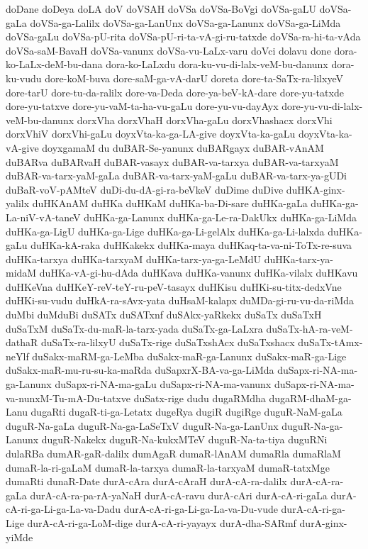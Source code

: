 {doDane
doDeya
doLA
doV
doVSAH
doVSa
doVSa-BoVgi
doVSa-gaLU
doVSa-gaLa
doVSa-ga-Lalilx
doVSa-ga-LanUnx
doVSa-ga-Lanunx
doVSa-ga-LiMda
doVSa-gaLu
doVSa-pU-rita
doVSa-pU-ri-ta-vA-gi-ru-tatxde
doVSa-ra-hi-ta-vAda
doVSa-saM-BavaH
doVSa-vanunx
doVSa-vu-LaLx-varu
doVci
dolavu
done
dora-ko-LaLx-deM-bu-dana
dora-ko-LaLxdu
dora-ku-vu-di-lalx-veM-bu-danunx
dora-ku-vudu
dore-koM-buva
dore-saM-ga-vA-darU
doreta
dore-ta-SaTx-ra-lilxyeV
dore-tarU
dore-tu-da-ralilx
dore-va-Deda
dore-ya-beV-kA-dare
dore-yu-tatxde
dore-yu-tatxve
dore-yu-vaM-ta-ha-vu-gaLu
dore-yu-vu-dayAyx
dore-yu-vu-di-lalx-veM-bu-danunx
dorxVha
dorxVhaH
dorxVha-gaLu
dorxVhashacx
dorxVhi
dorxVhiV
dorxVhi-gaLu
doyxVta-ka-ga-LA-give
doyxVta-ka-gaLu
doyxVta-ka-vA-give
doyxgamaM
du
duBAR-Se-yanunx
duBARgayx
duBAR-vAnAM
duBARva
duBARvaH
duBAR-vasayx
duBAR-va-tarxya
duBAR-va-tarxyaM
duBAR-va-tarx-yaM-gaLa
duBAR-va-tarx-yaM-gaLu
duBAR-va-tarx-ya-gUDi
duBaR-voV-pAMteV
duDi-du-dA-gi-ra-beVkeV
duDime
duDive
duHKA-ginx-yalilx
duHKAnAM
duHKa
duHKaM
duHKa-ba-Di-sare
duHKa-gaLa
duHKa-ga-La-niV-vA-taneV
duHKa-ga-Lanunx
duHKa-ga-Le-ra-DakUkx
duHKa-ga-LiMda
duHKa-ga-LigU
duHKa-ga-Lige
duHKa-ga-Li-gelAlx
duHKa-ga-Li-lalxda
duHKa-gaLu
duHKa-kA-raka
duHKakekx
duHKa-maya
duHKaq-ta-va-ni-ToTx-re-suva
duHKa-tarxya
duHKa-tarxyaM
duHKa-tarx-ya-ga-LeMdU
duHKa-tarx-ya-midaM
duHKa-vA-gi-hu-dAda
duHKava
duHKa-vanunx
duHKa-vilalx
duHKavu
duHKeVna
duHKeY-reV-teY-ru-peV-tasayx
duHKisu
duHKi-su-titx-dedxVne
duHKi-su-vudu
duHkA-ra-sAvx-yata
duHsaM-kalapx
duMDa-gi-ru-vu-da-riMda
duMbi
duMduBi
duSATx
duSATxnf
duSAkx-yaRkekx
duSaTx
duSaTxH
duSaTxM
duSaTx-du-maR-la-tarx-yada
duSaTx-ga-LaLxra
duSaTx-hA-ra-veM-dathaR
duSaTx-ra-lilxyU
duSaTx-rige
duSaTxshAcx
duSaTxshacx
duSaTx-tAmx-neYlf
duSakx-maRM-ga-LeMba
duSakx-maR-ga-Lanunx
duSakx-maR-ga-Lige
duSakx-maR-mu-ru-su-ka-maRda
duSapxrX-BA-va-ga-LiMda
duSapx-ri-NA-ma-ga-Lanunx
duSapx-ri-NA-ma-gaLu
duSapx-ri-NA-ma-vanunx
duSapx-ri-NA-ma-va-nunxM-Tu-mA-Du-tatxve
duSatx-rige
dudu
dugaRMdha
dugaRM-dhaM-ga-Lanu
dugaRti
dugaR-ti-ga-Letatx
dugeRya
dugiR
dugiRge
duguR-NaM-gaLa
duguR-Na-gaLa
duguR-Na-ga-LaSeTxV
duguR-Na-ga-LanUnx
duguR-Na-ga-Lanunx
duguR-Nakekx
duguR-Na-kukxMTeV
duguR-Na-ta-tiya
duguRNi
dulaRBa
dumAR-gaR-dalilx
dumAgaR
dumaR-lAnAM
dumaRla
dumaRlaM
dumaR-la-ri-gaLaM
dumaR-la-tarxya
dumaR-la-tarxyaM
dumaR-tatxMge
dumaRti
dunaR-Date
durA-cAra
durA-cAraH
durA-cA-ra-dalilx
durA-cA-ra-gaLa
durA-cA-ra-pa-rA-yaNaH
durA-cA-ravu
durA-cAri
durA-cA-ri-gaLa
durA-cA-ri-ga-Li-ga-La-va-Dadu
durA-cA-ri-ga-Li-ga-La-va-Du-vude
durA-cA-ri-ga-Lige
durA-cA-ri-ga-LoM-dige
durA-cA-ri-yayayx
durA-dha-SARmf
durA-ginx-yiMde
}

